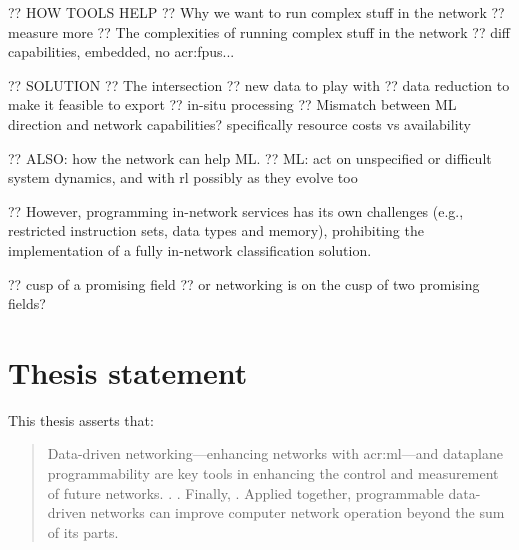 ?? HOW TOOLS HELP
?? Why we want to run complex stuff in the network
?? measure more
?? The complexities of running complex stuff in the network
?? diff capabilities, embedded, no \glspl{acr:fpu}...

?? SOLUTION
?? The intersection
?? new data to play with
?? data reduction to make it feasible to export
?? in-situ processing
?? Mismatch between ML direction and network capabilities? specifically resource costs vs availability

?? ALSO: how the network can help ML.
?? ML: act on unspecified or difficult system dynamics, and with rl possibly as they evolve too

?? However, programming in-network services has its own challenges (e.g., restricted instruction sets, data types and memory), prohibiting the implementation of a fully in-network classification solution.

?? cusp of a promising field
?? or networking is on the cusp of two promising fields?

\section{Thesis statement}
This thesis asserts that:
\begin{quotation}
	\noindent
	Data-driven networking---enhancing networks with \gls{acr:ml}---and dataplane programmability are key tools in enhancing the control and measurement of future networks.
	.
	.
	Finally, .
	Applied together, programmable data-driven networks can improve computer network operation beyond the sum of its parts.
\end{quotation}

